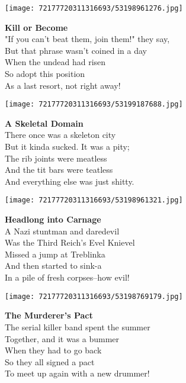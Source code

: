 \documentclass[10pt,letterpaper]{article}
\begin{document}
\begin{center}\texttt{[image: 72177720311316693/53198961276.jpg]}
\end{center}
\begin{center}
\textbf{Kill or Become}\\
\vskip 0.2in
"If you can't beat them, join them!" they say,\\
But that phrase wasn't coined in a day\\
When the undead had risen\\
So adopt this position\\
As a last resort, not right away!\\
\end{center}
\pagebreak

\begin{center}
\texttt{[image: 72177720311316693/53199187688.jpg]}
\end{center}

\begin{center}
\textbf{A Skeletal Domain}\\
\vskip 0.2in
There once was a skeleton city\\
But it kinda sucked.  It was a pity;\\
The rib joints were meatless\\
And the tit bars were teatless\\
And everything else was just shitty.\\
\end{center}
\pagebreak

\begin{center}\texttt{[image: 72177720311316693/53198961321.jpg]}
\end{center}
\begin{center}
\textbf{Headlong into Carnage}\\
\vskip 0.2in
A Nazi stuntman and daredevil\\
Was the Third Reich's Evel Knievel\\
Missed a jump at Treblinka\\
And then started to sink-a\\
In a pile of fresh corpses--how evil!\\
\end{center}
\pagebreak

\begin{center}\texttt{[image: 72177720311316693/53198769179.jpg]}
\end{center}
\begin{center}
\textbf{The Murderer's Pact}\\
\vskip 0.2in
The serial killer band spent the summer\\
Together, and it was a bummer\\
When they had to go back\\
So they all signed a pact\\
To meet up again with a new drummer!\\
\end{center}
\pagebreak
\end{document}

